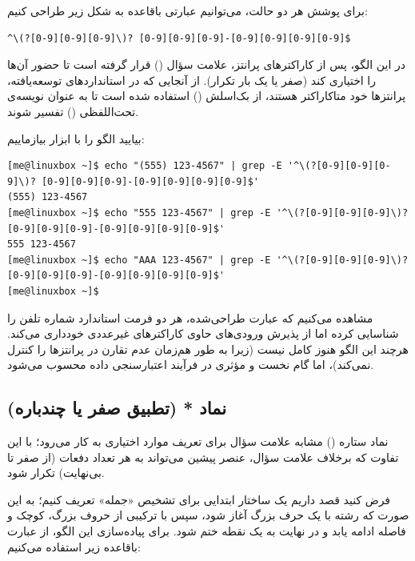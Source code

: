 برای پوشش هر دو حالت، می‌توانیم عبارتی باقاعده به شکل زیر طراحی کنیم:

\begin{latin}
\begin{lstlisting}
^\(?[0-9][0-9][0-9]\)? [0-9][0-9][0-9]-[0-9][0-9][0-9][0-9]$
\end{lstlisting}
\end{latin}

در این الگو، پس از کاراکترهای پرانتز، علامت سؤال () قرار گرفته است تا حضور آن‌ها را اختیاری کند (صفر یا یک بار تکرار). از آنجایی که در استانداردهای توسعه‌یافته، پرانتزها خود متاکاراکتر هستند، از بک‌اسلش (\cmd{\textbackslash}) استفاده شده است تا به عنوان نویسه‌ی تحت‌اللفظی () تفسیر شوند.

بیایید الگو را با ابزار  بیازماییم:

\begin{latin}
\begin{lstlisting}
[me@linuxbox ~]$ echo "(555) 123-4567" | grep -E '^\(?[0-9][0-9][0-9]\)? [0-9][0-9][0-9]-[0-9][0-9][0-9][0-9]$'
(555) 123-4567
[me@linuxbox ~]$ echo "555 123-4567" | grep -E '^\(?[0-9][0-9][0-9]\)? [0-9][0-9][0-9]-[0-9][0-9][0-9][0-9]$'
555 123-4567
[me@linuxbox ~]$ echo "AAA 123-4567" | grep -E '^\(?[0-9][0-9][0-9]\)? [0-9][0-9][0-9]-[0-9][0-9][0-9][0-9]$'
[me@linuxbox ~]$
\end{lstlisting}
\end{latin}

مشاهده می‌کنیم که عبارت طراحی‌شده، هر دو فرمت استاندارد شماره تلفن را شناسایی کرده اما از پذیرش ورودی‌های حاوی کاراکترهای غیرعددی خودداری می‌کند. هرچند این الگو هنوز کامل نیست (زیرا به طور هم‌زمان عدم تقارن در پرانتزها را کنترل نمی‌کند)، اما گام نخست و مؤثری در فرآیند اعتبارسنجی داده محسوب می‌شود.

\subsection{نماد * (تطبیق صفر یا چندباره)}

نماد ستاره (\cmd{*}) مشابه علامت سؤال برای تعریف موارد اختیاری به کار می‌رود؛ با این تفاوت که برخلاف علامت سؤال، عنصر پیشین می‌تواند به هر تعداد دفعات (از صفر تا بی‌نهایت) تکرار شود.

فرض کنید قصد داریم یک ساختار ابتدایی برای تشخیص «جمله» تعریف کنیم؛ به این صورت که رشته با یک حرف بزرگ آغاز شود، سپس با ترکیبی از حروف بزرگ، کوچک و فاصله ادامه یابد و در نهایت به یک نقطه ختم شود. برای پیاده‌سازی این الگو، از عبارت باقاعده زیر استفاده می‌کنیم:

